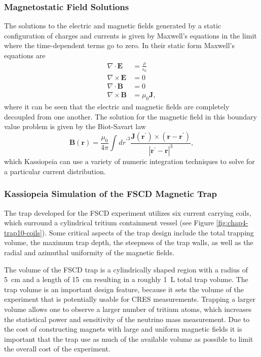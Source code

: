 \subsubsection*{Magnetostatic Field Solutions}

The solutions to the electric and magnetic fields generated by a static configuration of charges and currents is given by Maxwell's equations in the limit where the time-dependent terms go to zero. In their static form Maxwell's equations \cite{jackson_classical_1999} are
\begin{align}
    \nabla\cdot\mathbf{E}&=\frac{\rho}{\epsilon_0}\\
    \nabla\times\mathbf{E}&=0\\
    \nabla\cdot\mathbf{B}&=0\\
    \nabla\times\mathbf{B}&=\mu_0\mathbf{J},
\end{align}
where it can be seen that the electric and magnetic fields are completely decoupled from one another. The solution for the magnetic field in this boundary value problem is given by the Biot-Savart law
\begin{equation}
    \mathbf{B}(\mathbf{r}) = \frac{\mu_0}{4\pi}\int_{}^{}{d{r^{'}}^{3}\frac{\mathbf{J}(\mathbf{r}^{'})\times (\mathbf{r}-\mathbf{r}^{'})}{|\mathbf{r}^{'}-\mathbf{r}|^{3}}},
\end{equation}
which Kassiopeia can use a variety of numeric integration techniques to solve for a particular current distribution.

\subsubsection*{Kassiopeia Simulation of the FSCD Magnetic Trap}

The trap developed for the FSCD experiment utilizes six current carrying coils, which surround a cylindrical tritium containment vessel (see Figure \ref{fig:chap4-trap10-coils}). Some critical aspects of the trap design include the total trapping volume, the maximum trap depth, the steepness of the trap walls, as well as the radial and azimuthal uniformity of the magnetic fields.

The volume of the FSCD trap is a cylindrically shaped region with a radius of 5~cm and a length of 15~cm resulting in a roughly 1~L total trap volume. The trap volume is an important design feature, because it sets the volume of the experiment that is potentially usable for CRES measurements. Trapping a larger volume allows one to observe a larger number of tritium atoms, which increases the statistical power and sensitivity of the neutrino mass measurement. Due to the cost of constructing magnets with large and uniform magnetic fields it is important that the trap use as much of the available volume as possible to limit the overall cost of the experiment.

